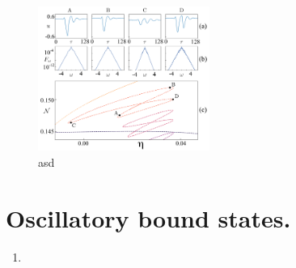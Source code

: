 \begin{figure}[h]
    \centering
    \includegraphics[width=0.5\textwidth]{imagenes/lle/Fig4-Isola.pdf}
    \caption{asd}
\end{figure}

\section{Oscillatory bound states.}

\begin{enumerate}
    \item 
\end{enumerate}